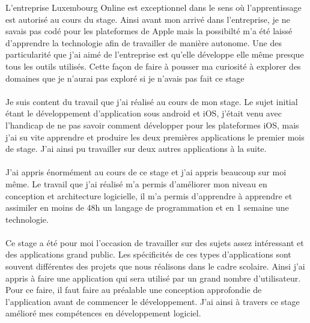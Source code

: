 L'entreprise Luxembourg Online est exceptionnel dans le sens où l'apprentissage est autorisé au cours du stage. Ainsi avant mon arrivé dans l'entreprise, je ne savais pas codé pour les plateformes de Apple mais la possibilté m'a été laissé d'apprendre la technologie afin de travailler de manière autonome. Une des particularité que j'ai aimé de l'entreprise est qu'elle développe elle même presque tous les outils utilisés. Cette façon de faire à pousser ma curiosité à explorer des domaines que je n'aurai pas exploré si je n'avais pas fait ce stage
\paragraph*{}
Je suis content du travail que j'ai réalisé au cours de mon stage. Le sujet initial étant le développement d'application sous android et iOS, j'était venu avec l'handicap de ne pas savoir comment développer pour les plateformes iOS, mais j'ai su vite apprendre et produire les deux premières applications le premier mois de stage. J'ai ainsi pu travailler sur deux autres applications à la suite.
\paragraph*{}
J'ai appris énormément au cours de ce stage et j'ai appris beaucoup sur moi même. Le travail que j'ai réalisé m'a permis d'améliorer mon niveau en conception et architecture logicielle, il m'a permis d'apprendre à apprendre et assimiler en moins de 48h un langage de programmation et en 1 semaine une technologie.
\paragraph*{}
Ce stage a été pour moi l'occasion de travailler sur des sujets assez intéressant et des applications grand public. Les spécificités de ces types d'applications sont souvent différentes des projets que nous réalisons dans le cadre scolaire. Ainsi j'ai appris à faire une application qui sera utilisé par un grand nombre d'utilisateur. Pour ce faire, il faut faire au préalable une conception approfondie de l'application avant de commencer le développement. J'ai ainsi à travers ce stage amélioré mes compétences en développement logiciel.